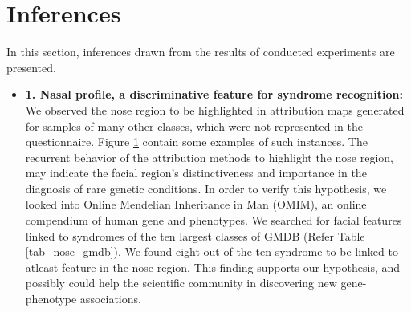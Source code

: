 \documentclass[../report.tex]{subfiles}
\begin{document}
    \section{Inferences}
    In this section, inferences drawn from the results of conducted experiments are presented.  
    \begin{itemize}
    	\item \textbf{1. Nasal profile,  a discriminative feature for syndrome recognition:} We observed the nose region to be highlighted in attribution maps generated for samples of many other classes, which were not represented in the questionnaire. Figure \ref{} contain some examples of such instances.  The recurrent behavior of the attribution methods to highlight the nose region, may indicate the facial region's distinctiveness and importance in the diagnosis of rare genetic conditions. In order to verify this hypothesis, we looked into Online Mendelian Inheritance in Man (OMIM), an online compendium of human gene and phenotypes. We searched for facial features linked to syndromes of the ten largest classes of GMDB (Refer Table \ref{tab_nose_gmdb}). We found eight out of the ten syndrome to be linked to atleast feature in the nose region. This finding supports our hypothesis, and possibly could help the scientific community in discovering new gene-phenotype associations. 
    	

\end{itemize}
\end{document}
